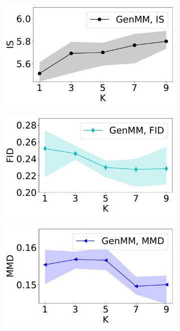 \begin{figure}[!tp]
  \captionsetup[subfigure]{justification=centering}
  \centering
  \begin{subfigure}{.24\textwidth}
    \centering
    \includegraphics[width=1.0\linewidth]{images/fashion-mnist/scores/std1EMGM-NM/EMGM-NM-IS-K.pdf}
  \end{subfigure}
  \vspace{-2pt}
  \begin{subfigure}{.24\textwidth}
    \centering
    \includegraphics[width=1.0\linewidth]{images/fashion-mnist/scores/std1EMGM-NM/EMGM-NM-FID-K.pdf}
  \end{subfigure}
  \centering
  \begin{subfigure}{.24\textwidth}
    \centering
    \includegraphics[width=1\linewidth]{images/fashion-mnist/scores/std1EMGM-NM/EMGM-NM-MMD-K.pdf}

\end{subfigure}
\end{figure}
